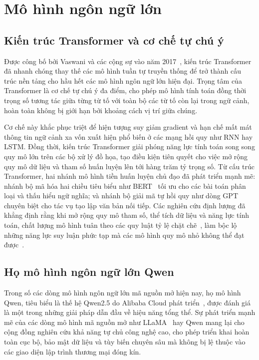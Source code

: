 \section{Mô hình ngôn ngữ lớn}
\subsection{Kiến trúc Transformer và cơ chế tự chú ý}
Được công bố bởi Vaswani và các cộng sự vào năm 2017~\cite{vaswani2017attention}, kiến trúc Transformer đã nhanh chóng thay thế các mô hình tuần tự truyền thống để trở thành cấu trúc nền tảng cho hầu hết các mô hình ngôn ngữ lớn hiện đại. Trọng tâm của Transformer là cơ chế tự chú ý đa điểm, cho phép mô hình tính toán đồng thời trọng số tương tác giữa từng từ tố với toàn bộ các từ tố còn lại trong ngữ cảnh, hoàn toàn không bị giới hạn bởi khoảng cách vị trí giữa chúng.

Cơ chế này khắc phục triệt để hiện tượng suy giảm gradient và hạn chế mất mát thông tin ngữ cảnh xa vốn xuất hiện phổ biến ở các mạng hồi quy như RNN hay LSTM. Đồng thời, kiến trúc Transformer giải phóng năng lực tính toán song song quy mô lớn trên các bộ xử lý đồ họa, tạo điều kiện tiên quyết cho việc mở rộng quy mô dữ liệu và tham số huấn luyện lên tới hàng trăm tỷ trọng số. Từ cấu trúc Transformer, hai nhánh mô hình tiền huấn luyện chủ đạo đã phát triển mạnh mẽ: nhánh bộ mã hóa hai chiều tiêu biểu như BERT~\cite{devlin2019bert} tối ưu cho các bài toán phân loại và thấu hiểu ngữ nghĩa; và nhánh bộ giải mã tự hồi quy như dòng GPT~\cite{brown2020gpt3} chuyên biệt cho tác vụ tạo lập văn bản nối tiếp. Các nghiên cứu định lượng đã khẳng định rằng khi mở rộng quy mô tham số, thể tích dữ liệu và năng lực tính toán, chất lượng mô hình tuân theo các quy luật tỷ lệ chặt chẽ~\cite{kaplan2020scaling}, làm bộc lộ những năng lực suy luận phức tạp mà các mô hình quy mô nhỏ không thể đạt được~\cite{wei2022emergent}.

\subsection{Họ mô hình ngôn ngữ lớn Qwen}
Trong số các dòng mô hình ngôn ngữ lớn mã nguồn mở hiện nay, họ mô hình Qwen, tiêu biểu là thế hệ Qwen2.5 do Alibaba Cloud phát triển~\cite{qwen25_2024}, được đánh giá là một trong những giải pháp dẫn đầu về hiệu năng tổng thể. Sự phát triển mạnh mẽ của các dòng mô hình mã nguồn mở như LLaMA~\cite{touvron2023llama} hay Qwen mang lại cho cộng đồng nghiên cứu khả năng tự chủ công nghệ cao, cho phép triển khai hoàn toàn cục bộ, bảo mật dữ liệu và tùy biến chuyên sâu mà không bị lệ thuộc vào các giao diện lập trình thương mại đóng kín.

